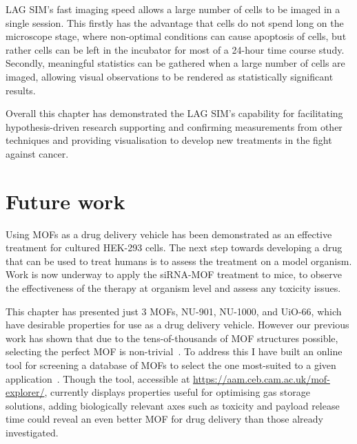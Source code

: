 LAG SIM's fast imaging speed allows a large number of cells to be imaged in a single session.
This firstly has the advantage that cells do not spend long on the microscope stage, where non-optimal conditions can cause apoptosis of cells, but rather cells can be left in the incubator for most of a 24-hour time course study.
Secondly, meaningful statistics can be gathered when a large number of cells are imaged, allowing visual observations to be rendered as statistically significant results.

Overall this chapter has demonstrated the LAG SIM's capability for facilitating hypothesis-driven research supporting and confirming measurements from other techniques and providing visualisation to develop new treatments in the fight against cancer.

\section{Future work}
Using MOFs as a drug delivery vehicle has been demonstrated as an effective treatment for cultured HEK-293 cells.
The next step towards developing a drug that can be used to treat humans is to assess the treatment on a model organism.
Work is now underway to apply the siRNA-MOF treatment to mice, to observe the effectiveness of the therapy at organism level and assess any toxicity issues.

This chapter has presented just 3 MOFs, NU-901, NU-1000, and UiO-66, which have desirable properties for use as a drug delivery vehicle.
However our previous work has shown that due to the tens-of-thousands of MOF structures possible, selecting the perfect MOF is non-trivial~\cite{moghadam2018computer}.
To address this I have built an online tool for screening a database of MOFs to select the one most-suited to a given application~\cite{moghadam2018computer}.
Though the tool, accessible at \url{https://aam.ceb.cam.ac.uk/mof-explorer/}, currently displays properties useful for optimising gas storage solutions, adding biologically relevant axes such as toxicity and payload release time could reveal an even better MOF for drug delivery than those already investigated.

